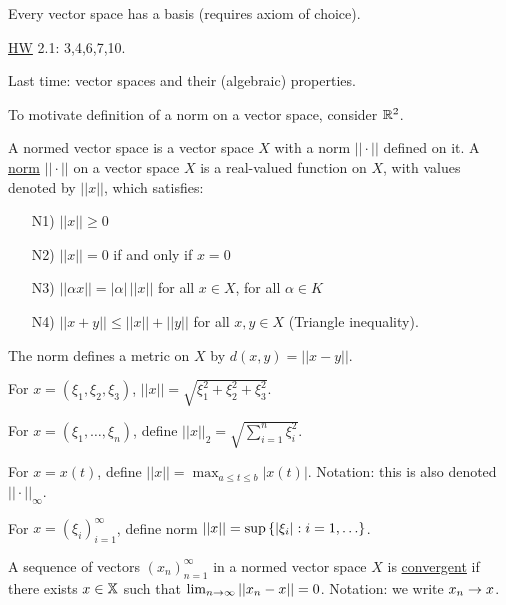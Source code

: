 \documentclass[]{article}
\begin{document}
\begin{theorem}
	Every vector space has a basis (requires axiom of choice).
\end{theorem}

\ul{HW} 2.1: 3,4,6,7,10.

Last time: vector spaces and their (algebraic) properties.

To motivate definition of a norm on a vector space, consider $\mathbb{R}^2$.

\begin{definition}
	A normed vector space is a vector space $X$ with a norm $||\cdot||$ defined on it.
	A \ul{norm} $||\cdot||$ on a vector space $X$ is a real-valued function on $X$, with values denoted by $||x||$, which satisfies:
	\begin{itemize}
		\item[N1)] $||x||\geq 0$
		\item[N2)] $||x||=0$ if and only if $x=0$
		\item[N3)] $||\alpha x|| = |\alpha|\,||x||$ for all $x\in X$, for all $\alpha\in K$
		\item[N4)] $||x+y||\leq ||x||+||y||$ for all $x,y\in X$ (Triangle inequality).
	\end{itemize}
\end{definition}
\begin{note}
	The norm defines a metric on $X$ by $d(x,y) = ||x-y||$.
\end{note}
\begin{example}
	 For $x=(\xi_1,\xi_2,\xi_3)$, $||x||=\sqrt{\xi_1^2+\xi_2^2+\xi_3^2}$.
\end{example}
\begin{example}
	[$\mb R^n$] For $x=(\xi_1,\dots,\xi_n)$, define $||x||_2 = \sqrt{\sum_{i=1}^n \xi_i^2}$.
\end{example}
\begin{example}
	[$X = C{[}a,b{]}$] For $x=x(t)$, define $\displaystyle||x|| = \max_{a\leq t\leq b}|x(t)|$.
	Notation: this is also denoted $||\cdot||_\infty$.
\end{example}
\begin{example}
	[$X = \ell^\infty$] For $x = (\xi_i)_{i=1}^\infty$, define norm $||x|| = \sup\setc{|\xi_i|}{i=1,\dots}$.
\end{example}

\begin{definition}
	A sequence of vectors $(x_n)_{n=1}^\infty$ in a normed vector space $X$ is \ul{convergent} if there exists $x\in\mathbb{X}$ such that $\lim_{n\rightarrow\infty}||x_n-x||=0$.
	Notation: we write $x_n\rightarrow x$.
\end{definition}
\end{document}

